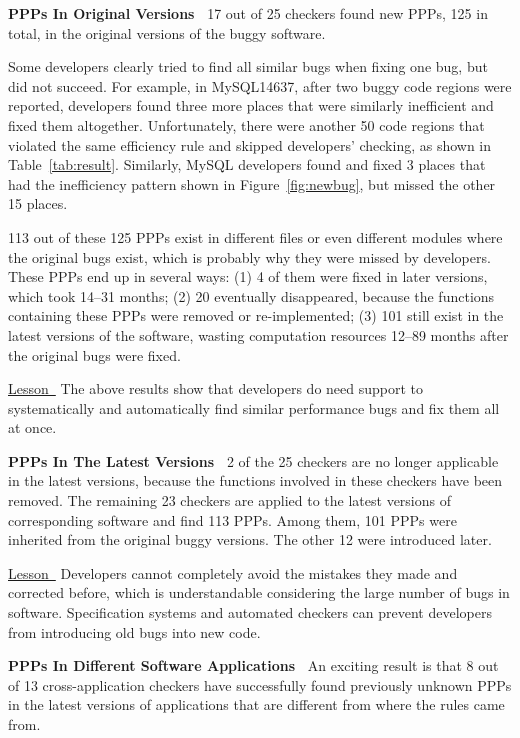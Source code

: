 {\bf PPPs In Original Versions\ }
17 out of 25 checkers found new PPPs, 125 in total, in the original versions
of the buggy software.

Some developers clearly tried to find all similar bugs when
fixing one bug, but did not succeed.
For example, in MySQL14637, after two buggy code regions were 
reported, developers found three more places that were similarly
inefficient and fixed them altogether. Unfortunately,
there were another 50 code regions that violated the same efficiency
rule and skipped developers' checking, as shown in 
Table~\ref{tab:result}. Similarly, MySQL developers found and fixed 3 places
that had the inefficiency pattern shown in Figure~\ref{fig:newbug},
but missed the other 15 places.

113 out of these 125 PPPs exist in different files or even different 
modules where the original bugs exist, which is probably why they were missed by
developers. These PPPs end up in several ways:
(1) 4 of them were fixed in later versions, which took 14--31 months;
(2) 20 eventually disappeared, because the
functions containing these PPPs were removed or re-implemented;
(3) 101 still exist in the latest versions of the software, wasting
computation resources 12--89 months after the original bugs were fixed.

\underline{Lesson\ } 
The above results show that developers do need support to systematically and 
automatically find similar performance bugs and fix them all at 
once.

{\bf PPPs In The Latest Versions\ }
2 of the 25 checkers are no longer applicable in the latest versions,
because the functions involved in these checkers
have been removed. The remaining 23 checkers are applied to
the latest versions of corresponding software and find
113 PPPs. Among them, 101 PPPs were
inherited from the original buggy versions.
The other 12 were introduced later. 

\underline{Lesson\ }
Developers cannot completely avoid the mistakes they made
and corrected before, which is understandable considering the large number of bugs in
software.
Specification systems and automated checkers can prevent developers 
from introducing old bugs into new code.

{\bf PPPs In Different Software Applications\ }
An exciting result is that 8 out of 13 cross-application checkers 
have successfully found previously unknown
PPPs in the latest versions of applications that are different from
where the rules came from.

